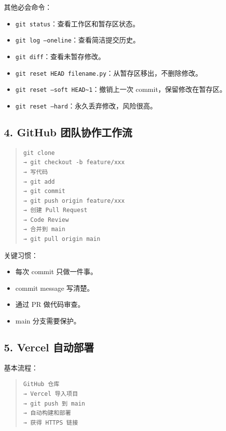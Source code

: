 \documentclass[UTF8,zihao=-4]{ctexart}
\begin{document}
其他必会命令：

\begin{itemize}
\item \texttt{git status}：查看工作区和暂存区状态。
\item \texttt{git log --oneline}：查看简洁提交历史。
\item \texttt{git diff}：查看未暂存修改。
\item \texttt{git reset HEAD filename.py}：从暂存区移出，不删除修改。
\item \texttt{git reset --soft HEAD\textasciitilde{}1}：撤销上一次 commit，保留修改在暂存区。
\item \texttt{git reset --hard}：永久丢弃修改，风险很高。
\end{itemize}

\subsection{4. GitHub 团队协作工作流}

\begin{quote}
\footnotesize
\begin{verbatim}
git clone
→ git checkout -b feature/xxx
→ 写代码
→ git add
→ git commit
→ git push origin feature/xxx
→ 创建 Pull Request
→ Code Review
→ 合并到 main
→ git pull origin main
\end{verbatim}
\end{quote}

关键习惯：

\begin{itemize}
\item 每次 commit 只做一件事。
\item commit message 写清楚。
\item 通过 PR 做代码审查。
\item main 分支需要保护。
\end{itemize}

\subsection{5. Vercel 自动部署}

基本流程：

\begin{quote}
\footnotesize
\begin{verbatim}
GitHub 仓库
→ Vercel 导入项目
→ git push 到 main
→ 自动构建和部署
→ 获得 HTTPS 链接
\end{verbatim}
\end{quote}
\end{document}
